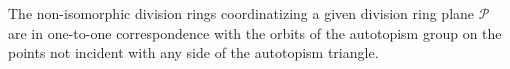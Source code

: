 The non-isomorphic division rings coordinatizing a given division ring plane $\mathcal{P}$ are in one-to-one correspondence with the orbits of the autotopism group on the points not incident with any side of the autotopism triangle.
